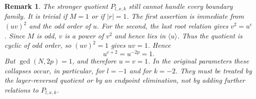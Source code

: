 \documentclass{article}
\newtheorem{remark}[theorem]{Remark}
\begin{document}
\begin{remark}
\label{rem:genus-four-x-minus-two-minus-one-P-collapse}
The stronger quotient $P_{l,x,k}$ still cannot handle every boundary
family.  It is trivial if $M=1$ or if $|r|=1$.  The first assertion is
immediate from $(uv)^2$ and the odd order of $u$.  For the second, the last
root relation gives $v^2=u^c$.  Since $M$ is odd, $v$ is a power of $v^2$
and hence lies in $\langle u\rangle$.  Thus the quotient is cyclic of odd
order, so $(uv)^2=1$ gives $uv=1$.  Hence
\[
       u^{c+2}=u^{-2p}=1.
\]
But $\gcd(N,2p)=1$, and therefore $u=v=1$.  In the original parameters
these collapses occur, in particular, for $l=-1$ and for $k=-2$.
They must be treated by the layer-reversed quotient or by an endpoint
elimination, not by adding further relations to $P_{l,x,k}$.
\end{remark}
\end{document}
